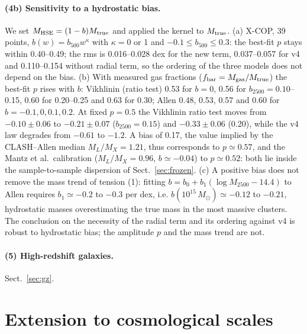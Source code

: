 \documentclass[11pt,a4paper]{article}
\newcommand{\Msun}{M_\odot}
\newcommand{\fbar}{f_{\rm bar}}
\begin{document}
\paragraph{(4b) Sensitivity to a hydrostatic bias.} We set $M_{\rm HSE}=(1-b)M_{\rm true}$ and applied the kernel to $M_{\rm true}$. (a) X-COP, 39 points, $b(w)=b_{500}w^\kappa$ with $\kappa=0$ or 1 and $-0.1\le b_{500}\le0.3$: the best-fit $p$ stays within 0.40--0.49; the rms is 0.016--0.028 dex for the new term, 0.037--0.057 for v4 and 0.110--0.154 without radial term, so the ordering of the three models does not depend on the bias. (b) With measured gas fractions ($\fbar=M_{\rm gas}/M_{\rm true}$) the best-fit $p$ rises with $b$: Vikhlinin (ratio test) 0.53 for $b=0$, 0.56 for $b_{2500}=0.10$--0.15, 0.60 for 0.20--0.25 and 0.63 for 0.30; Allen 0.48, 0.53, 0.57 and 0.60 for $b=-0.1,0,0.1,0.2$. At fixed $p=0.5$ the Vikhlinin ratio test moves from $-0.10\pm0.06$ to $-0.21\pm0.07$ ($b_{2500}=0.15$) and $-0.33\pm0.06$ (0.20), while the v4 law degrades from $-0.61$ to $-1.2$. A bias of 0.17, the value implied by the CLASH--Allen median $M_L/M_X=1.21$, thus corresponds to $p\simeq0.57$, and the Mantz et al.\ calibration ($M_L/M_X=0.96$, $b\simeq-0.04$) to $p\simeq0.52$: both lie inside the sample-to-sample dispersion of Sect.~\ref{sec:frozen}. (c) A positive bias does not remove the mass trend of tension (1): fitting $b=b_0+b_1(\log M_{2500}-14.4)$ to Allen requires $b_1\simeq-0.2$ to $-0.3$ per dex, i.e. $b(10^{15}\,\Msun)\simeq-0.12$ to $-0.21$, hydrostatic masses overestimating the true mass in the most massive clusters. The conclusion on the necessity of the radial term and its ordering against v4 is robust to hydrostatic bias; the amplitude $p$ and the mass trend are not.

\paragraph{(5) High-redshift galaxies.} Sect.~\ref{sec:gz}.

\section{Extension to cosmological scales}
\label{sec:cosmo}
\end{document}
